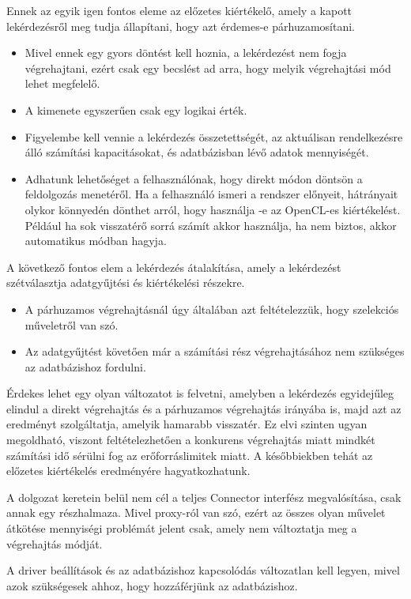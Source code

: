 Ennek az egyik igen fontos eleme az előzetes kiértékelő, amely a kapott lekérdezésről meg tudja állapítani, hogy azt érdemes-e párhuzamosítani.
\begin{itemize}
	\item Mivel ennek egy gyors döntést kell hoznia, a lekérdezést nem fogja végrehajtani, ezért csak egy becslést ad arra, hogy melyik végrehajtási mód lehet megfelelő.
	\item A kimenete egyszerűen csak egy logikai érték.
	\item Figyelembe kell vennie a lekérdezés összetettségét, az aktuálisan rendelkezésre álló számítási kapacitásokat, és adatbázisban lévő adatok mennyiségét.
	\item Adhatunk lehetőséget a felhasználónak, hogy direkt módon döntsön a feldolgozás menetéről. Ha a felhasználó ismeri a rendszer előnyeit, hátrányait olykor könnyedén dönthet arról, hogy használja -e az OpenCL-es kiértékelést. Például ha sok visszatérő sorrá számít akkor használja, ha nem biztos, akkor automatikus módban hagyja.
\end{itemize}

A következő fontos elem a lekérdezés átalakítása, amely a lekérdezést szétválasztja adatgyűjtési és kiértékelési részekre.
\begin{itemize}
	\item A párhuzamos végrehajtásnál úgy általában azt feltételezzük, hogy szelekciós műveletről van szó.
	\item Az adatgyűjtést követően már a számítási rész végrehajtásához nem szükséges az adatbázishoz fordulni.
\end{itemize}

Érdekes lehet egy olyan változatot is felvetni, amelyben a lekérdezés egyidejűleg elindul a direkt végrehajtás és a párhuzamos végrehajtás irányába is, majd azt az eredményt szolgáltatja, amelyik hamarabb visszatér. Ez elvi szinten ugyan megoldható, viszont feltételezhetően a konkurens végrehajtás miatt mindkét számítási idő sérülni fog az erőforráslimitek miatt. A későbbiekben tehát az előzetes kiértékelés eredményére hagyatkozhatunk.


A dolgozat keretein belül nem cél a teljes Connector interfész megvalósítása, csak annak egy részhalmaza. Mivel proxy-ról van szó, ezért az összes olyan művelet átkötése mennyiségi problémát jelent csak, amely nem változtatja meg a végrehajtás módját.

A driver beállítások és az adatbázishoz kapcsolódás változatlan kell legyen, mivel azok szükségesek ahhoz, hogy hozzáférjünk az adatbázishoz.

